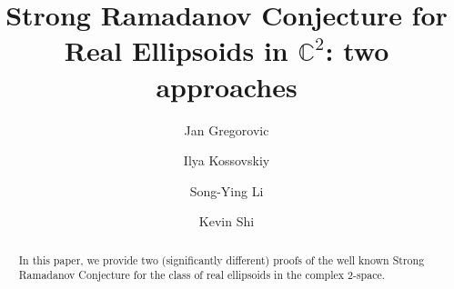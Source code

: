 \documentclass[12pt]{amsart}
\def\CC{\mathbb{C}}
\begin{document}
\title{Strong Ramadanov Conjecture for  Real Ellipsoids in $\CC^2$: two approaches }

\author{Jan Gregorovic}
\address{Department of Mathematics, University of Ostrava, Czechia  $\&$ Institute of Discrete Mathematics and Geometry, TU Wien, Vienna, Austria}

\author{Ilya Kossovskiy}
\address{Department of Mathematics, Sustech University, Shenzhen, China  \& International Center of Mathematics, Shenzhen, China}

\author{Song-Ying Li}
\address{Department of Mathematics, University of California, Irvine, USA}

\author{Kevin Shi}
\address{Tarbut $V^{\prime}$Torah  Community Day School, USA}




\begin{abstract}
In this paper, we provide two (significantly different) proofs of the well known Strong Ramadanov Conjecture for the class of real ellipsoids in the complex $2$-space.    
\end{abstract}

\maketitle
\end{document}
